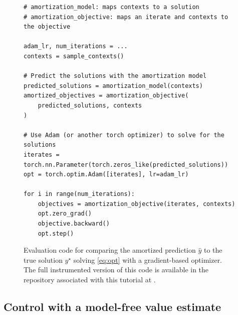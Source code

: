 \begin{figure}[t]
\begin{lstlisting}
# amortization_model: maps contexts to a solution
# amortization_objective: maps an iterate and contexts to the objective

adam_lr, num_iterations = ...
contexts = sample_contexts()

# Predict the solutions with the amortization model
predicted_solutions = amortization_model(contexts)
amortized_objectives = amortization_objective(
    predicted_solutions, contexts
)

# Use Adam (or another torch optimizer) to solve for the solutions
iterates = torch.nn.Parameter(torch.zeros_like(predicted_solutions))
opt = torch.optim.Adam([iterates], lr=adam_lr)

for i in range(num_iterations):
    objectives = amortization_objective(iterates, contexts)
    opt.zero_grad()
    objective.backward()
    opt.step()
\end{lstlisting}
\caption{Evaluation code for comparing the amortized prediction $\hat y$
  to the true solution $y^\star$ solving \cref{eq:opt} with a
  gradient-based optimizer.
  The full instrumented version of this code is available in
  the repository associated with this tutorial at
  \texttt{}.
}
\label{lst:evaluation}
\end{figure}

\subsection{Control with a model-free value estimate}
\label{sec:impl:model-free}

